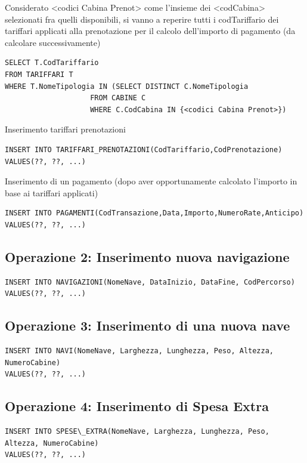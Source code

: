 \documentclass[a4paper, titlepage]{report}
\begin{document}
Considerato <codici Cabina Prenot> come l'insieme dei <codCabina> selezionati fra quelli disponibili, si vanno a reperire tutti i codTariffario dei tariffari applicati alla prenotazione per il calcolo dell'importo di pagamento (da calcolare successivamente)
\begin{lstlisting}
SELECT T.CodTariffario
FROM TARIFFARI T
WHERE T.NomeTipologia IN (SELECT DISTINCT C.NomeTipologia
                    FROM CABINE C
                    WHERE C.CodCabina IN {<codici Cabina Prenot>})
\end{lstlisting}

Inserimento tariffari prenotazioni
\begin{lstlisting}
INSERT INTO TARIFFARI_PRENOTAZIONI(CodTariffario,CodPrenotazione)
VALUES(??, ??, ...)
\end{lstlisting}

Inserimento di un pagamento (dopo aver opportunamente calcolato l'importo in base ai tariffari applicati)
\begin{lstlisting}
INSERT INTO PAGAMENTI(CodTransazione,Data,Importo,NumeroRate,Anticipo)
VALUES(??, ??, ...)
\end{lstlisting}

\subsection*{Operazione 2: Inserimento nuova navigazione}
\begin{lstlisting}
INSERT INTO NAVIGAZIONI(NomeNave, DataInizio, DataFine, CodPercorso)
VALUES(??, ??, ...)
\end{lstlisting}

\vspace{0.5cm}
\subsection*{Operazione 3: Inserimento di una nuova nave}
\begin{lstlisting}
INSERT INTO NAVI(NomeNave, Larghezza, Lunghezza, Peso, Altezza, NumeroCabine)
VALUES(??, ??, ...)
\end{lstlisting}

\vspace{0.5cm}
\subsection*{Operazione 4: Inserimento di Spesa Extra}
\begin{lstlisting}
INSERT INTO SPESE\_EXTRA(NomeNave, Larghezza, Lunghezza, Peso, Altezza, NumeroCabine)
VALUES(??, ??, ...)
\end{lstlisting}
\end{document}
